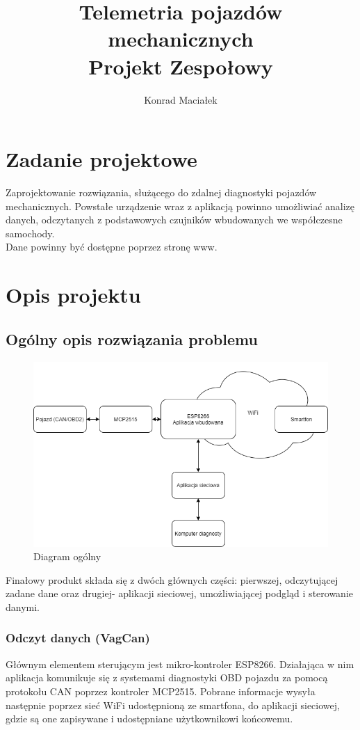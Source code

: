 \documentclass[10pt,a4paper]{article}
\author{Konrad Maciałek}
\title{Telemetria pojazdów mechanicznych\\
\large Projekt Zespołowy}
\begin{document}
	\maketitle
	\newpage
	\section{Zadanie projektowe}
	Zaprojektowanie rozwiązania, służącego do zdalnej diagnostyki pojazdów mechanicznych. Powstałe urządzenie wraz z aplikacją powinno umożliwiać analizę danych, odczytanych z podstawowych czujników wbudowanych we współczesne samochody.
	\\
	Dane powinny być dostępne poprzez stronę www.
	\section{Opis projektu}
		\subsection{Ogólny opis rozwiązania problemu}
		\begin{figure}[H]
			\centering
			\includegraphics[width=0.7\linewidth]{./remoteCarDiagz.drawio}
			\caption[Diagram ogólny]{Diagram ogólny}
			\label{fig:remotecardiagz}
		\end{figure}
		Finałowy produkt składa się z dwóch głównych części: pierwszej, odczytującej zadane dane oraz drugiej- aplikacji sieciowej, umożliwiającej podgląd i sterowanie danymi. 
		\subsubsection{Odczyt danych (VagCan)}
		Głównym elementem sterującym jest mikro-kontroler ESP8266. Działająca w nim aplikacja komunikuje się z systemami diagnostyki OBD pojazdu za pomocą protokołu CAN poprzez kontroler MCP2515. Pobrane informacje wysyła następnie poprzez sieć WiFi udostępnioną ze smartfona, do aplikacji sieciowej, gdzie są one zapisywane i udostępniane użytkownikowi końcowemu. 
\end{document}
